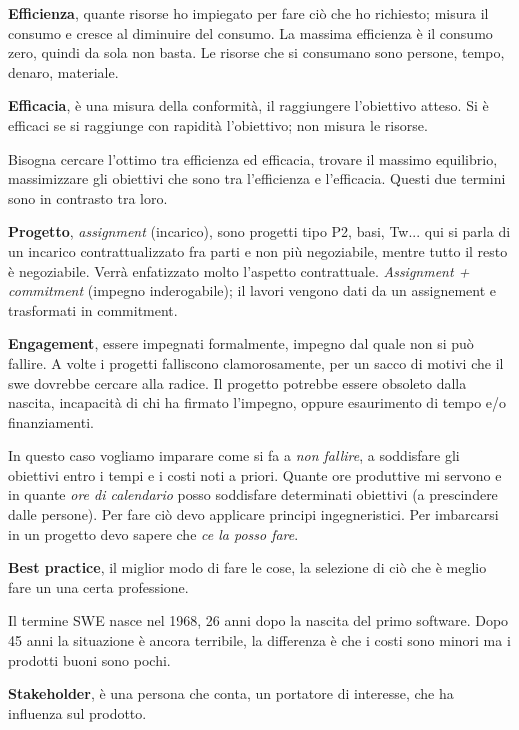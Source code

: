 \textbf{Efficienza}, quante risorse ho impiegato per fare ciò che ho richiesto; misura il consumo e cresce al diminuire del consumo. La massima efficienza è il consumo zero, quindi da sola non basta. Le risorse che si consumano sono persone, tempo, denaro, materiale.

\textbf{Efficacia}, è una misura della conformità, il raggiungere l'obiettivo atteso. Si è efficaci se si raggiunge con rapidità l'obiettivo; non misura le risorse.

Bisogna cercare l'ottimo tra efficienza ed efficacia, trovare il massimo equilibrio, massimizzare gli obiettivi che sono tra l'efficienza e l'efficacia. Questi due termini sono in contrasto tra loro.

\textbf{Progetto}, \textit{assignment} (incarico), sono progetti tipo P2, basi, Tw... qui si parla di un incarico contrattualizzato fra parti e non più negoziabile, mentre tutto il resto è negoziabile. Verrà enfatizzato molto l'aspetto contrattuale. \textit{Assignment + commitment} (impegno inderogabile); il lavori vengono dati da un assignement e trasformati in commitment.

\textbf{Engagement}, essere impegnati formalmente, impegno dal quale non si può fallire. A volte i progetti falliscono clamorosamente, per un sacco di motivi che il swe dovrebbe cercare alla radice. Il progetto potrebbe essere obsoleto dalla nascita, incapacità di chi ha firmato l'impegno, oppure esaurimento di tempo e/o finanziamenti. 

In questo caso vogliamo imparare come si fa a \textit{non fallire}, a soddisfare gli obiettivi entro i tempi e i costi noti a priori. Quante ore produttive mi servono e in quante \textit{ore di calendario} posso soddisfare determinati obiettivi (a prescindere dalle persone). Per fare ciò devo applicare principi ingegneristici. Per imbarcarsi in un progetto devo sapere che \textit{ce la posso fare}.

\textbf{Best practice}, il miglior modo di fare le cose, la selezione di ciò che è meglio fare un una certa professione.

Il termine SWE nasce nel 1968, 26 anni dopo la nascita del primo software. Dopo 45 anni la situazione è ancora terribile, la differenza è che i costi sono minori ma i prodotti buoni sono pochi.

\textbf{Stakeholder}, è una persona che conta, un portatore di interesse, che ha influenza sul prodotto.


